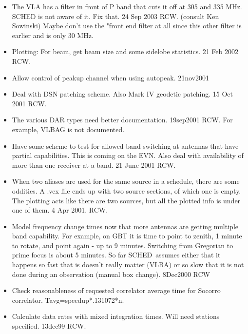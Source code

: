 \documentclass{report}
\newcommand{\schedb}{{\sc SCHED~}}
\begin{document}
\begin{itemize}
\item The VLA has a filter in front of P band that cuts it off at
      305 and 335 MHz.  SCHED is not aware of it.  Fix that.  24 Sep 2003
      RCW.  (consult Ken Sowinski)  Maybe don't use the "front end
      filter at all since this other filter is earlier and is only
      30 MHz.

\item Plotting:  For beam, get beam size and some sidelobe statistics.
      21 Feb 2002 RCW.

\item Allow control of peakup channel when using autopeak.  21nov2001

\item Deal with DSN patching scheme.  Also Mark IV geodetic patching.
      15 Oct 2001  RCW.

\item The various DAR types need better documentation.  19sep2001 RCW.
      For example, VLBAG is not documented.

\item Have some scheme to test for allowed band switching at antennas
      that have partial capabilities.  This is coming on the EVN.
      Also deal with availability of more than one receiver at a band.
      21 June 2001  RCW.

\item When two aliases are used for the same source in a schedule, there
      are some oddities.  A .vex file ends up with two source sections,
      of which one is empty.  The plotting acts like there are two sources,
      but all the plotted info is under one of them.  4 Apr 2001.  RCW.

\item Model frequency change times now that more antennas are getting
      multiple band capability.  For example, on GBT it is time to
      point to zenith, 1 minute to rotate, and point again - up to
      9 minutes.  Switching from Gregorian to prime focus is about
      5 minutes.  So far \schedb assumes either that it happens so
      fast that is doesn't really matter (VLBA) or so slow that it
      is not done during an observation (manual box change).
      8Dec2000 RCW

\item Check reasonableness of requested correlator average time for
      Socorro correlator.  Tavg=speedup*.131072*n.

\item Calculate data rates with mixed integration times.  Will need
      stations specified.  13dec99 RCW.


\end{itemize}
\end{document}

